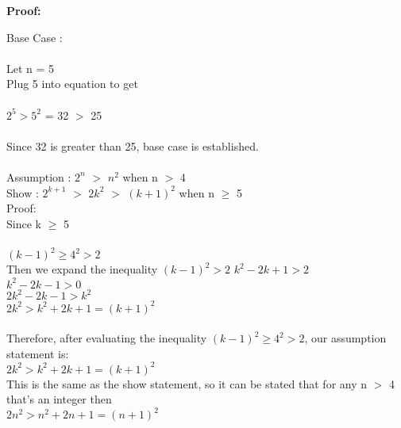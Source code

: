 \documentclass[12pt]{article}
\begin{document}
\par
\bigskip
{\bf Proof:}
\par

Base Case : \\
\\
	Let n = 5 \\
	Plug 5 into equation to get \\
	\\
	$2^{5} > 5^{2}$ = 32 $>$ 25 \\
	\\
Since 32 is greater than 25, base case is established. \\
\\

Assumption : $2^{n}$ $>$ $n^{2}$ when n $>$ 4 \\
Show :  $2^{k + 1}$ $>$ $2k^{2}$ $>$ $(k + 1)^{2}$ when n $\geq$ 5 \\

Proof: \\
	Since k $\geq$ 5 \\
	\\
	$(k - 1)^{2} \geq 4^{2} > 2$
	\\
	Then we expand the inequality $(k - 1)^{2} > 2$
	$k^{2} - 2k + 1 > 2$ \\
	$k^{2} - 2k - 1 > 0$ \\
	$2k^{2} - 2k - 1 > k^{2}$ \\
	$2k^{2} > k^{2} + 2k + 1 = (k + 1)^{2}$ \\
	 \\
	 Therefore, after evaluating the inequality $(k - 1)^{2} \geq 4^{2} > 2$, our assumption statement is: \\
	 $2k^{2} > k^{2} + 2k + 1 = (k + 1)^{2}$  \\
	 This is the same as the show statement, so it can be stated that for any n $>$ 4 that's an integer
	 then \\
	 $2n^{2} > n^{2} + 2n + 1 = (n + 1)^{2}$  \\
\end{document}
